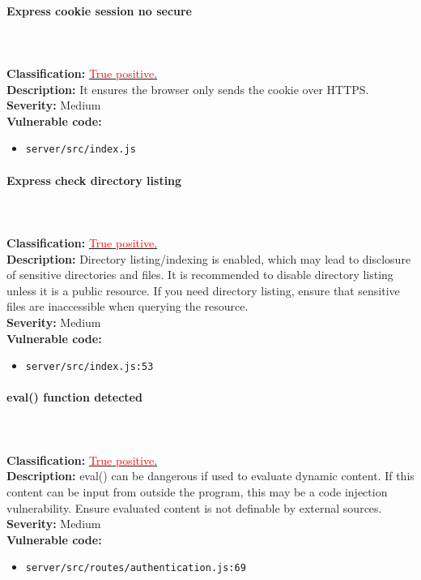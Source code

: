 \documentclass[]{article}
\begin{document}
\paragraph{Express cookie session no secure} \mbox{} \\ \\
\textbf{Classification:} \hyperref[subsubsec:sensitive_cookie_without_secure_and_httponly_attributes]{\textcolor{red}{True} \textcolor{red}{positive}.} \\ 
\textbf{Description:} It ensures the browser only sends the cookie over HTTPS. \\
\textbf{Severity:}  Medium\\ 
\textbf{Vulnerable code:}
\begin{itemize}
    \item \texttt{server/src/index.js}
\end{itemize}

\paragraph{Express check directory listing} \mbox{} \\ \\
\textbf{Classification:} \hyperref[subsubsec:exposure_of_information_through_directory_listing]{\textcolor{red}{True} \textcolor{red}{positive}.} \\
\textbf{Description:} Directory listing/indexing is enabled, which may lead to disclosure of sensitive directories and 
          files. It is recommended to disable directory listing unless it is a public resource. If you need
          directory listing, ensure that sensitive files are inaccessible when querying the resource. \\
\textbf{Severity:}  Medium\\ 
\textbf{Vulnerable code:}
\begin{itemize}
    \item \texttt{server/src/index.js:53}
\end{itemize}

\paragraph{eval() function detected} \mbox{} \\ \\
\textbf{Classification:} \hyperref[subsubsec:improper_neutralization_of_directives_in_dynamically_evaluated_code]{\textcolor{red}{True} \textcolor{red}{positive}.} \\ 
\textbf{Description:} eval() can be dangerous if used to evaluate dynamic content. If this content can be input from outside the program, this may be a code injection vulnerability. Ensure evaluated content is not definable by external sources. \\ 
\textbf{Severity:} Medium \\ 
\textbf{Vulnerable code:}
\begin{itemize}
    \item \texttt{server/src/routes/authentication.js:69}
\end{itemize}
\end{document}
